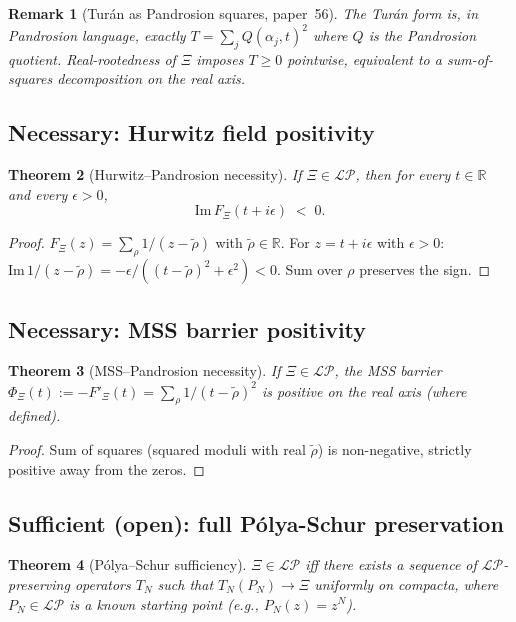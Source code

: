 \documentclass[11pt,a4paper]{article}
\newtheorem{theorem}{Theorem}[section]
\newtheorem{remark}[theorem]{Remark}
\begin{document}
\begin{remark}[Tur\'an as Pandrosion squares, paper~56]
The Tur\'an form is, in Pandrosion language, exactly $T = \sum_j Q(\alpha_j, t)^2$
where $Q$ is the Pandrosion quotient. Real-rootedness of $\Xi$ imposes
$T \ge 0$ pointwise, equivalent to a sum-of-squares decomposition on the
real axis.
\end{remark}

\subsection{Necessary: Hurwitz field positivity}

\begin{theorem}[Hurwitz--Pandrosion necessity]\label{thm:hurwitz}
If $\Xi \in \mathcal{LP}$, then for every $t \in \mathbb{R}$ and every
$\epsilon > 0$,
\[
\mathrm{Im}\, F_\Xi(t + i\epsilon) \;<\; 0.
\]
\end{theorem}

\begin{proof}
$F_\Xi(z) = \sum_\rho 1/(z - \tilde\rho)$ with $\tilde\rho \in \mathbb{R}$.
For $z = t + i\epsilon$ with $\epsilon > 0$:
$\mathrm{Im}\,1/(z - \tilde\rho) = -\epsilon/((t - \tilde\rho)^2 + \epsilon^2) < 0$.
Sum over $\rho$ preserves the sign.
\end{proof}

\subsection{Necessary: MSS barrier positivity}

\begin{theorem}[MSS--Pandrosion necessity]\label{thm:mss}
If $\Xi \in \mathcal{LP}$, the MSS barrier
$\Phi_\Xi(t) := -F'_\Xi(t) = \sum_\rho 1/(t - \tilde\rho)^2$ is positive
on the real axis (where defined).
\end{theorem}
\begin{proof}
Sum of squares (squared moduli with real $\tilde\rho$) is non-negative,
strictly positive away from the zeros.
\end{proof}

\subsection{Sufficient (open): full Pólya-Schur preservation}

\begin{theorem}[P\'olya--Schur sufficiency]\label{thm:polya-suff}
$\Xi \in \mathcal{LP}$ iff there exists a sequence of $\mathcal{LP}$-preserving
operators $T_N$ such that $T_N(P_N) \to \Xi$ uniformly on compacta, where
$P_N \in \mathcal{LP}$ is a known starting point (e.g., $P_N(z) = z^N$).
\end{theorem}
\end{document}
